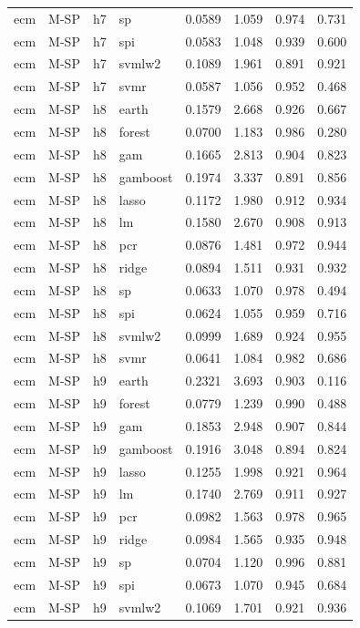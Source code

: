 \begin{ThreePartTable}
\begin{longtable}[t]{llclcccc}
ecm & M-SP & h7 & sp & 0.0589 & 1.059 & 0.974 & 0.731\\
ecm & M-SP & h7 & spi & 0.0583 & 1.048 & 0.939 & 0.600\\
ecm & M-SP & h7 & svmlw2 & 0.1089 & 1.961 & 0.891 & 0.921\\
ecm & M-SP & h7 & svmr & 0.0587 & 1.056 & 0.952 & 0.468\\
\addlinespace
ecm & M-SP & h8 & earth & 0.1579 & 2.668 & 0.926 & 0.667\\
ecm & M-SP & h8 & forest & 0.0700 & 1.183 & 0.986 & 0.280\\
ecm & M-SP & h8 & gam & 0.1665 & 2.813 & 0.904 & 0.823\\
ecm & M-SP & h8 & gamboost & 0.1974 & 3.337 & 0.891 & 0.856\\
ecm & M-SP & h8 & lasso & 0.1172 & 1.980 & 0.912 & 0.934\\
ecm & M-SP & h8 & lm & 0.1580 & 2.670 & 0.908 & 0.913\\
ecm & M-SP & h8 & pcr & 0.0876 & 1.481 & 0.972 & 0.944\\
ecm & M-SP & h8 & ridge & 0.0894 & 1.511 & 0.931 & 0.932\\
ecm & M-SP & h8 & sp & 0.0633 & 1.070 & 0.978 & 0.494\\
ecm & M-SP & h8 & spi & 0.0624 & 1.055 & 0.959 & 0.716\\
ecm & M-SP & h8 & svmlw2 & 0.0999 & 1.689 & 0.924 & 0.955\\
ecm & M-SP & h8 & svmr & 0.0641 & 1.084 & 0.982 & 0.686\\
\addlinespace
ecm & M-SP & h9 & earth & 0.2321 & 3.693 & 0.903 & 0.116\\
ecm & M-SP & h9 & forest & 0.0779 & 1.239 & 0.990 & 0.488\\
ecm & M-SP & h9 & gam & 0.1853 & 2.948 & 0.907 & 0.844\\
ecm & M-SP & h9 & gamboost & 0.1916 & 3.048 & 0.894 & 0.824\\
ecm & M-SP & h9 & lasso & 0.1255 & 1.998 & 0.921 & 0.964\\
ecm & M-SP & h9 & lm & 0.1740 & 2.769 & 0.911 & 0.927\\
ecm & M-SP & h9 & pcr & 0.0982 & 1.563 & 0.978 & 0.965\\
ecm & M-SP & h9 & ridge & 0.0984 & 1.565 & 0.935 & 0.948\\
ecm & M-SP & h9 & sp & 0.0704 & 1.120 & 0.996 & 0.881\\
ecm & M-SP & h9 & spi & 0.0673 & 1.070 & 0.945 & 0.684\\
ecm & M-SP & h9 & svmlw2 & 0.1069 & 1.701 & 0.921 & 0.936\\

\end{longtable}
\end{ThreePartTable}
